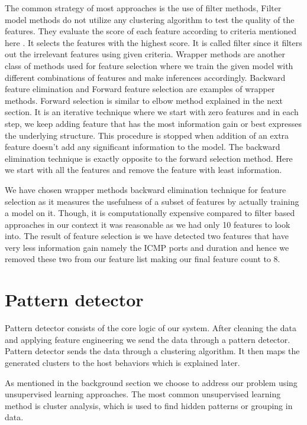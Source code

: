 	The common strategy of most approaches is the use of filter methods, Filter model methods do not utilize any clustering algorithm to test the quality of the features. They evaluate the score of each feature according to criteria mentioned here \cite{dash2002feature}. It selects the features with the highest score. It is called filter since it filters out the irrelevant features using given criteria. 
	Wrapper methods are another class of methods used for feature selection where we train the given model with different combinations of features and make inferences accordingly.
	Backward feature elimination and Forward feature selection are examples of wrapper methods. Forward selection is similar to elbow method explained in the next section. It is an iterative technique where we start with zero features and in each step, we keep adding feature that has the most information gain or best expresses the underlying structure. This procedure is stopped when addition of an extra feature doesn't add any significant information to the model. The backward elimination technique is exactly opposite to the forward selection method. Here we start with all the features and remove the feature with least information.
	
	We have chosen wrapper methods backward elimination technique for feature selection as it measures the usefulness of a subset of features by actually training a model on it. Though, it is computationally expensive compared to filter based approaches in our context it was reasonable as we had only 10 features to look into. The result of feature selection is we have detected two features that have very less information gain namely the ICMP ports and duration and hence we removed these two from our feature list making our final feature count to 8.

\section{Pattern detector}
Pattern detector consists of the core logic of our system. After cleaning the data and applying feature engineering we send the data through a pattern detector. Pattern detector sends the data through a clustering algorithm. It then maps the generated clusters to the host behaviors which is explained later.

As mentioned in the background section we choose to address our problem using unsupervised learning approaches. The most common unsupervised learning method is cluster analysis, which is used to find hidden patterns or grouping in data. 


